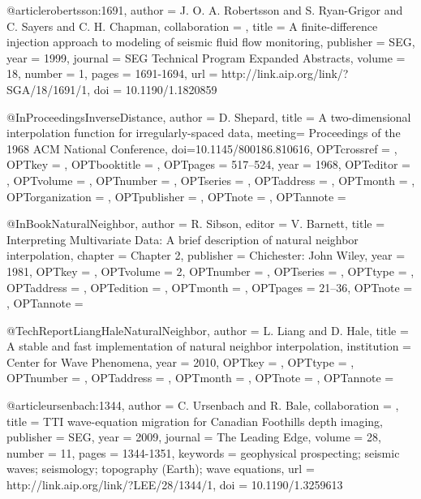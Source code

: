 {@article{robertsson:1691,
author = {J. O. A. Robertsson and S.  Ryan-Grigor and C. Sayers and C. H. Chapman},
collaboration = {},
title = {A finite-difference injection approach to modeling of seismic fluid flow monitoring},
publisher = {SEG},
year = {1999},
journal = {SEG Technical Program Expanded Abstracts},
volume = {18},
number = {1},
pages = {1691-1694},
url = {http://link.aip.org/link/?SGA/18/1691/1},
doi = {10.1190/1.1820859}
}


@InProceedings{InverseDistance,
  author = 	 {D. Shepard},
  title = 	 {A two-dimensional interpolation function for
                  irregularly-spaced data},
  meeting= {Proceedings of the 1968 ACM National Conference},
  doi={10.1145/800186.810616},
  OPTcrossref =  {},
  OPTkey = 	 {},
  OPTbooktitle = {},
  OPTpages = 	 {517–524},
  year = 	 {1968},
  OPTeditor = 	 {},
  OPTvolume = 	 {},
  OPTnumber = 	 {},
  OPTseries = 	 {},
  OPTaddress = 	 {},
  OPTmonth = 	 {},
  OPTorganization = {},
  OPTpublisher = {},
  OPTnote = 	 {},
  OPTannote = 	 {}
}

@InBook{NaturalNeighbor,
  author = 	 {R. Sibson},
  editor = 	 {V. Barnett},
  title = 	 {Interpreting Multivariate Data: A brief description of natural neighbor interpolation},
  chapter = 	 {Chapter 2},
  publisher = 	 {Chichester: John Wiley},
  year = 	 {1981},
  OPTkey = 	 {},
  OPTvolume = 	 {2},
  OPTnumber = 	 {},
  OPTseries = 	 {},
  OPTtype = 	 {},
  OPTaddress = 	 {},
  OPTedition = 	 {},
  OPTmonth = 	 {},
  OPTpages = 	 {21–36},
  OPTnote = 	 {},
  OPTannote = 	 {}
}

@TechReport{LiangHaleNaturalNeighbor,
  author = 	 {L. Liang and D. Hale},
  title = 	 {A stable and fast implementation of natural neighbor
                  interpolation},
  institution =  {Center for Wave Phenomena},
  year = 	 {2010},
  OPTkey = 	 {},
  OPTtype = 	 {},
  OPTnumber = 	 {},
  OPTaddress = 	 {},
  OPTmonth = 	 {},
  OPTnote = 	 {},
  OPTannote = 	 {}
}


@article{ursenbach:1344,
author = {C. Ursenbach and R. Bale},
collaboration = {},
title = {TTI wave-equation migration for Canadian Foothills depth imaging},
publisher = {SEG},
year = {2009},
journal = {The Leading Edge},
volume = {28},
number = {11},
pages = {1344-1351},
keywords = {geophysical prospecting; seismic waves; seismology; topography (Earth); wave equations},
url = {http://link.aip.org/link/?LEE/28/1344/1},
doi = {10.1190/1.3259613}
}







}
